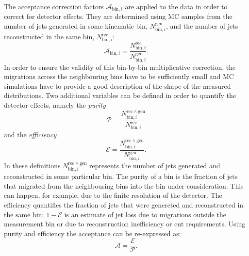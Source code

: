 The acceptance correction factors $\mathcal{A}_{\mathrm{bin},i}$ are applied to the data in order to correct for detector effects. They are determined using MC samples from the number of jets generated in some kinematic bin, $N_{\mathrm{bin},i}^{\mathrm{gen}}$, and the number of jets reconstructed in the same bin, $N_{\mathrm{bin},i}^{\mathrm{rec}}$:
\begin{equation}
 \mathcal{A}_{\mathrm{bin},i}=\frac{N_{\mathrm{bin},i}^{\mathrm{rec}}}{N_{\mathrm{bin},i}^{\mathrm{gen}}}.
 \label{eq:accdef}
\end{equation}
In order to ensure the validity of this bin-by-bin multiplicative correction, the migrations across the neighbouring bins have to be sufficiently small and MC simulations have to provide a good description of the shape of the measured distributions. Two additional variables can be defined in order to quantify the detector effects,  namely the \emph{purity}
\begin{equation}
 \mathcal{P}=\frac{N_{\mathrm{bin},i}^{\mathrm{rec \wedge gen}}}{N_{\mathrm{bin},i}^{\mathrm{rec}}}
\label{eq:puritydef}
\end{equation}
and the \emph{efficiency}
\begin{equation}
 \mathcal{E}=\frac{N_{\mathrm{bin},i}^{\mathrm{rec \wedge gen}}}{N_{\mathrm{bin},i}^{\mathrm{gen}}}.
\label{eq:efficiencydef}
\end{equation}
In these definitions $N_{\mathrm{bin},i}^{\mathrm{rec \wedge gen}}$ represents the number of jets generated and reconstructed in some particular bin. The purity of a bin is the fraction of jets that migrated from the neighbouring bins into the bin under consideration. This can happen, for example, due to the finite resolution of the detector. The efficiency quantifies the fraction of jets that were genereted and reconstructed in the same bin; $1-\mathcal{E}$ is an estimate of jet loss due to migrations outside the measurement bin or due to reconstruction inefficiency or cut requirements. Using purity and efficiency the acceptance can be re-expressed as:
\begin{equation}
  \mathcal{A}  = \frac{\mathcal{E}}{\mathcal{P}}.
\end{equation}


